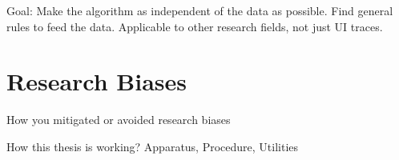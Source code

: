 Goal: Make the algorithm as independent of the data as possible.
Find general rules to feed the data.
Applicable to other research fields, not just UI traces.


\section{Research Biases}
How you mitigated or avoided research biases

How this thesis is working?
Apparatus, Procedure, Utilities
